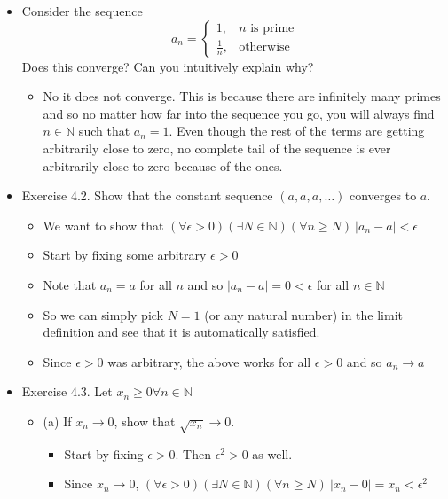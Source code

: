 \documentclass{article}
\begin{document}
\begin{itemize}
\begin{itemize}
\begin{itemize}
        \end{itemize}
    \end{itemize}
    \item Consider the sequence
    \[
    a_n = \left\{ \begin{array}{lr}
        1, & n \text{ is prime} \\
        \frac{1}{n}, & \text{otherwise}
    \end{array} \right.
    \]
    Does this converge? Can you intuitively explain why?
    \begin{itemize}
        \item No it does not converge. This is because there are infinitely many primes and so no matter how far into the sequence you go, you will always find $n \in \mathbb{N}$ such that $a_n = 1$. Even though the rest of the terms are getting arbitrarily close to zero, no complete tail of the sequence is ever arbitrarily close to zero because of the ones.
    \end{itemize}
    \item Exercise 4.2. Show that the constant sequence $(a,a,a,\dots)$ converges to $a$.
    \begin{itemize}
        \item We want to show that $(\forall \epsilon >0)(\exists N \in \mathbb{N})(\forall n \ge N) \ \vert a_n - a \vert < \epsilon$
        \item Start by fixing some arbitrary $\epsilon > 0$
        \item Note that $a_n = a$ for all $n$ and so $\vert a_n - a \vert = 0 < \epsilon$ for all $n \in \mathbb{N}$
        \item So we can simply pick $N=1$ (or any natural number) in the limit definition and see that it is automatically satisfied.
        \item Since $\epsilon > 0$ was arbitrary, the above works for all $\epsilon > 0$ and so $a_n \rightarrow a$
    \end{itemize}
    \item Exercise 4.3. Let $x_n \ge 0 \forall n \in \mathbb{N}$
    \begin{itemize}
        \item (a) If $x_n \rightarrow 0$, show that $\sqrt{x_n} \rightarrow 0$.
        \begin{itemize}
            \item Start by fixing $\epsilon > 0$. Then $\epsilon^2 > 0$ as well.
            \item Since $x_n \rightarrow 0$, $(\forall \epsilon > 0)(\exists N \in \mathbb{N})(\forall n \ge N) \ \vert x_n - 0 \vert = x_n < \epsilon^2$

\end{itemize}
\end{itemize}
\end{itemize}
\end{document}
